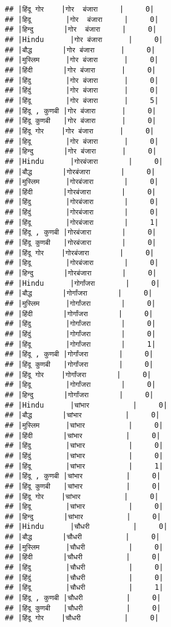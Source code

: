 \documentclass[
]{article}
\begin{document}
\begin{verbatim}
## |हिंदू गोर    |गोर  बंजारा     |     0|
## |हिदू        |गोर  बंजारा     |     0|
## |हिन्दु       |गोर  बंजारा     |     0|
## |Hindu      |गोर बंजारा      |     0|
## |बौद्ध       |गोर बंजारा      |     0|
## |मुस्लिम      |गोर बंजारा      |     0|
## |हिंदी       |गोर बंजारा      |     0|
## |हिंदु        |गोर बंजारा      |     0|
## |हिंदुं        |गोर बंजारा      |     0|
## |हिंदू        |गोर बंजारा      |     5|
## |हिंदू , कुणबी |गोर बंजारा      |     0|
## |हिंदू कुणबी   |गोर बंजारा      |     0|
## |हिंदू गोर    |गोर बंजारा      |     0|
## |हिदू        |गोर बंजारा      |     0|
## |हिन्दु       |गोर बंजारा      |     0|
## |Hindu      |गोरबंजारा       |     0|
## |बौद्ध       |गोरबंजारा       |     0|
## |मुस्लिम      |गोरबंजारा       |     0|
## |हिंदी       |गोरबंजारा       |     0|
## |हिंदु        |गोरबंजारा       |     0|
## |हिंदुं        |गोरबंजारा       |     0|
## |हिंदू        |गोरबंजारा       |     1|
## |हिंदू , कुणबी |गोरबंजारा       |     0|
## |हिंदू कुणबी   |गोरबंजारा       |     0|
## |हिंदू गोर    |गोरबंजारा       |     0|
## |हिदू        |गोरबंजारा       |     0|
## |हिन्दु       |गोरबंजारा       |     0|
## |Hindu      |गोर्गांजरा       |     0|
## |बौद्ध       |गोर्गांजरा       |     0|
## |मुस्लिम      |गोर्गांजरा       |     0|
## |हिंदी       |गोर्गांजरा       |     0|
## |हिंदु        |गोर्गांजरा       |     0|
## |हिंदुं        |गोर्गांजरा       |     0|
## |हिंदू        |गोर्गांजरा       |     1|
## |हिंदू , कुणबी |गोर्गांजरा       |     0|
## |हिंदू कुणबी   |गोर्गांजरा       |     0|
## |हिंदू गोर    |गोर्गांजरा       |     0|
## |हिदू        |गोर्गांजरा       |     0|
## |हिन्दु       |गोर्गांजरा       |     0|
## |Hindu      |चांभार          |     0|
## |बौद्ध       |चांभार          |     0|
## |मुस्लिम      |चांभार          |     0|
## |हिंदी       |चांभार          |     0|
## |हिंदु        |चांभार          |     0|
## |हिंदुं        |चांभार          |     0|
## |हिंदू        |चांभार          |     1|
## |हिंदू , कुणबी |चांभार          |     0|
## |हिंदू कुणबी   |चांभार          |     0|
## |हिंदू गोर    |चांभार          |     0|
## |हिदू        |चांभार          |     0|
## |हिन्दु       |चांभार          |     0|
## |Hindu      |चौधरी          |     0|
## |बौद्ध       |चौधरी          |     0|
## |मुस्लिम      |चौधरी          |     0|
## |हिंदी       |चौधरी          |     0|
## |हिंदु        |चौधरी          |     0|
## |हिंदुं        |चौधरी          |     0|
## |हिंदू        |चौधरी          |     1|
## |हिंदू , कुणबी |चौधरी          |     0|
## |हिंदू कुणबी   |चौधरी          |     0|
## |हिंदू गोर    |चौधरी          |     0|

\end{verbatim}
\end{document}
